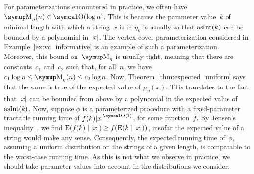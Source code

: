 For parameterizations encountered in practice, we often have $\upM_\eta(n) \in \bigO(\log n)$.
This is because the parameter value~$k$ of minimal length with which a string~$x$ is in $\eta_k$ is usually so that $\operatorname{asInt}(k)$ can be bounded by a polynomial in ${\lvert x\rvert}$.
The vertex cover parameterization considered in Example~\ref{ex:vc_informative} is an example of such a parameterization.
Moreover, this bound on~$\upM_\eta$ is usually tight, meaning that there are constants~$c_1$ and~$c_2$ such that, for all~$n$, we have $c_1 \log n \le \upM_\eta(n) \le c_2 \log n$.
Now, Theorem~\ref{thm:expected_uniform} says that the same is true of the expected value of $\mu_\eta(x)$.
This translates to the fact that ${\lvert x\rvert}$ can be bounded from above by a polynomial in the expected value of $\operatorname{asInt}(k)$.
Now, suppose $\phi$ is a parameterized procedure with a fixed-parameter tractable running time of $f(k)\length{x}^{\bigO(1)}$, for some function~$f$.
By Jensen's inequality~\parencite{cover2006elements}, we find $\operatorname*{E}(f(k) \mid {\lvert x\rvert}) \ge f(\operatorname*{E}(k \mid {\lvert x\rvert}))$, insofar the expected value of a string would make any sense.
Consequently, the expected running time of~$\phi$, assuming a uniform distribution on the strings of a given length, is comparable to the worst-case running time.
As this is not what we observe in practice, we should take parameter values into account in the distributions we consider.

